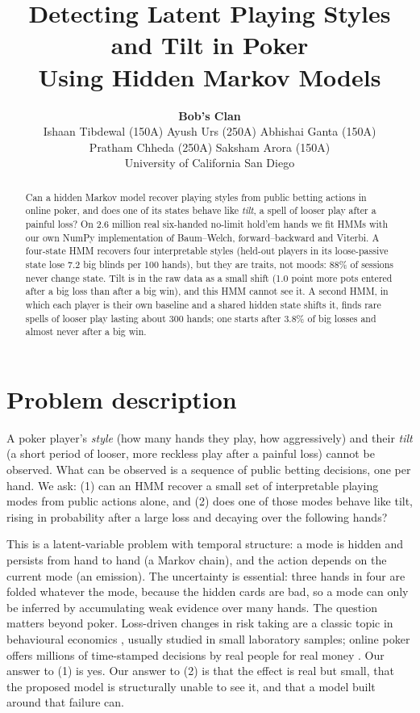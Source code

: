 \documentclass{article}
\title{Detecting Latent Playing Styles and Tilt in Poker\\Using Hidden Markov Models}
\author{%
  \textbf{Bob's Clan}\\
  Ishaan Tibdewal (150A) \quad Ayush Urs (250A) \quad Abhishai Ganta (150A)\\
  Pratham Chheda (250A) \quad Saksham Arora (150A)\\
  University of California San Diego
}
\newcommand{\tiltsummary}{A second HMM, in which each player is their own baseline and a shared hidden state shifts it, finds rare spells of looser play lasting about 300 hands; one starts after 3.8\% of big losses and almost never after a big win.}
\begin{document}
\maketitle

\begin{abstract}
Can a hidden Markov model recover playing styles from public betting actions in online poker, and does one of its states behave like \emph{tilt}, a spell of looser play after a painful loss? On 2.6 million real six-handed no-limit hold'em hands we fit HMMs with our own NumPy implementation of Baum--Welch, forward--backward and Viterbi. A four-state HMM recovers four interpretable styles (held-out players in its loose-passive state lose 7.2 big blinds per 100 hands), but they are traits, not moods: 88\% of sessions never change state. Tilt is in the raw data as a small shift (1.0 point more pots entered after a big loss than after a big win), and this HMM cannot see it. \tiltsummary
\end{abstract}

\section{Problem description}
A poker player's \emph{style} (how many hands they play, how aggressively) and their \emph{tilt} (a short period of looser, more reckless play after a painful loss) cannot be observed. What can be observed is a sequence of public betting decisions, one per hand. We ask: (1) can an HMM recover a small set of interpretable playing modes from public actions alone, and (2) does one of those modes behave like tilt, rising in probability after a large loss and decaying over the following hands?

This is a latent-variable problem with temporal structure: a mode is hidden and persists from hand to hand (a Markov chain), and the action depends on the current mode (an emission). The uncertainty is essential: three hands in four are folded whatever the mode, because the hidden cards are bad, so a mode can only be inferred by accumulating weak evidence over many hands. The question matters beyond poker. Loss-driven changes in risk taking are a classic topic in behavioural economics \cite{thaler1990}, usually studied in small laboratory samples; online poker offers millions of time-stamped decisions by real people for real money \cite{smith2009,eil2014}. Our answer to (1) is yes. Our answer to (2) is that the effect is real but small, that the proposed model is structurally unable to see it, and that a model built around that failure can.
\end{document}
